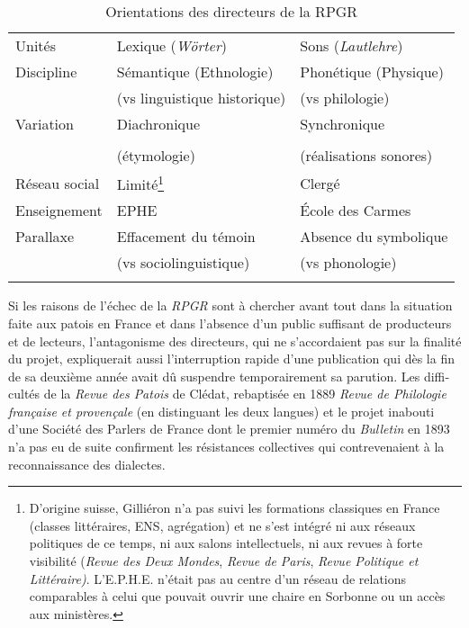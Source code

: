 \documentclass[french,output=paper,colorlinks,citecolor=brown]{../langscibook}
\begin{document}
\begin{otherlanguage}{french}
\begin{table}
\begin{tabularx}{\textwidth}{lQQ}
Unités  &   Lexique (\textit{Wörter})  &    Sons (\textit{Lautlehre})\\

Discipline & Sémantique (Ethnologie) &   Phonétique (Physique)\\

   & (vs linguistique historique)  &  (vs philologie)\\

Variation &  Diachronique    &    Synchronique \\
\\
  &  (étymologie)     &   (réalisations sonores) \\

Réseau   social & Limité\footnote{D’origine suisse, Gilliéron n’a pas suivi les formations classiques en France (classes littéraires, ENS, agrégation) et ne s’est intégré ni aux réseaux politiques de ce temps, ni aux salons intellectuels, ni aux revues à forte visibilité (\textit{Revue des Deux Mondes}, \textit{Revue de Paris}, \textit{Revue Politique et Littéraire)}. L’E.P.H.E. n’était pas au centre d’un réseau de relations comparables à celui que pouvait ouvrir une chaire en Sorbonne ou un accès aux ministères.}    &    Clergé \\

Enseignement & EPHE      &    École des Carmes \\

Parallaxe & Effacement du témoin  &    Absence du symbolique\\

 &   (vs sociolinguistique)  &    (vs phonologie)\\
\lspbottomrule
\end{tabularx}
\caption{Orientations des directeurs de la RPGR\label{table: Tab 2.}}
\end{table}

Si les raisons de l’échec de la \textit{RPGR} sont à chercher avant tout dans la situation faite aux patois en France et dans l’absence d’un public suffisant de producteurs et de lecteurs, l’antagonisme des directeurs, qui ne s’accordaient pas sur la finalité du projet, expliquerait aussi l’interruption rapide d’une publication qui dès la fin de sa deuxième année avait dû suspendre temporairement sa parution. Les difficultés de la \textit{Revue des Patois} de Clédat, rebaptisée en 1889 \textit{Revue de Philologie française et provençale} (en distinguant les deux langues) et le projet inabouti d’une Société des Parlers de France dont le premier numéro du \textit{Bulletin} en 1893 n’a pas eu de suite confirment les résistances collectives qui contrevenaient à la reconnaissance des dialectes. 


\end{otherlanguage}
\end{document}
